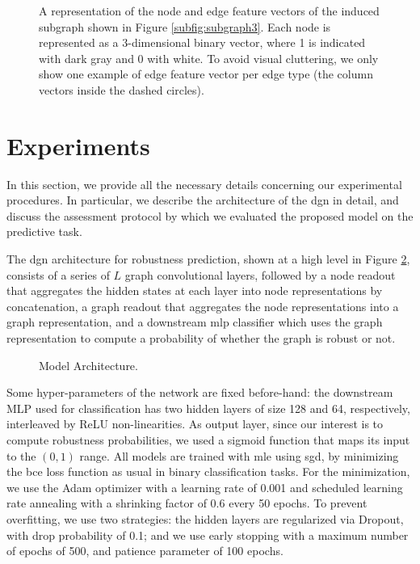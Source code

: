 \begin{figure}[h!]
    \centering
    \resizebox{.8\textwidth}{!}{}
    \caption{A representation of the node and edge feature vectors of the induced subgraph shown in Figure \ref{subfig:subgraph3}. Each node is represented as a 3-dimensional binary vector, where 1 is indicated with dark gray and 0 with white. To avoid visual cluttering, we only show one example of edge feature vector per edge type (the column vectors inside the dashed circles).}
    \label{fig:pathway-graph-features}
\end{figure}

\section{Experiments}\label{sec:pathway-experiments}
In this section, we provide all the necessary details concerning our experimental procedures. In particular, we describe the architecture of the \gls{dgn} in detail, and discuss the assessment protocol by which we evaluated the proposed model on the predictive task.

The \gls{dgn} architecture for robustness prediction, shown at a high level in Figure \ref{fig:architecture}, consists of a series of $L$ graph convolutional layers, followed by a node readout that aggregates the hidden states at each layer into node representations by concatenation, a graph readout that aggregates the node representations into a graph representation, and a downstream \gls{mlp} classifier which uses the graph representation to compute a probability of whether the graph is robust or not.
\begin{figure}[h!]
    \centering
    \resizebox{.95\textwidth}{!}{}
    \caption{Model Architecture.}
    \label{fig:architecture}
\end{figure}
Some hyper-parameters of the network are fixed before-hand: the downstream MLP used for classification has two hidden layers of size 128 and 64, respectively, interleaved by ReLU non-linearities. As output layer, since our interest is to compute robustness probabilities, we used a sigmoid function that maps its input to the $(0, 1)$ range. All models are trained with \gls{mle} using \gls{sgd}, by minimizing the \gls{bce} loss function as usual in binary classification tasks. For the minimization, we use the Adam optimizer with a learning rate of 0.001 and scheduled learning rate annealing with a shrinking factor of 0.6 every 50 epochs. To prevent overfitting, we use two strategies: the hidden layers are regularized via Dropout, with drop probability of 0.1; and we use early stopping with a maximum number of epochs of 500, and patience parameter of 100 epochs.

